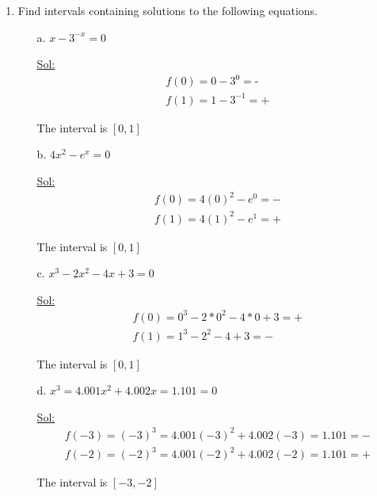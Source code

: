 \begin{enumerate}
  \item Find intervals containing solutions to the following equations.
    \begin{itemize}
      \item[a.] $x-3^{-x} = 0$

        \underline{Sol:}\\
        $$
        \begin{array}{l}
          f(0) = 0 - 3^0 = \textrm{-}\\
          f(1) = 1 - 3^{-1} = \textrm{+}
        \end{array}
        $$

        The interval is $[0, 1]$

        \bigbreak
      \item[b.] $4x^2 - e^x = 0$

        \underline{Sol:}\\
        $$
        \begin{array}{l}
          f(0) = 4(0)^2 - e^0 = -\\
          f(1) = 4(1)^2 - e^1 = +
        \end{array}
        $$

        The interval is $[0, 1]$
        \bigbreak

      \item[c.] $x^3 - 2x^2 - 4x + 3 = 0$

        \underline{Sol:}\\
        $$
        \begin{array}{l}
          f(0) = 0^3 - 2*0^2 - 4*0 + 3 = + \\
          f(1) = 1^3 - 2^2 - 4 + 3 = -
        \end{array}
        $$

        The interval is $[0, 1]$

        \bigbreak
      \item[d.] $x^3 = 4.001x^2 + 4.002x = 1.101 = 0$

        \underline{Sol:}\\

        $$
        \begin{array}{l}
          f(-3) = (-3)^3 = 4.001(-3)^2 + 4.002(-3) = 1.101 = -\\
          f(-2) = (-2)^3 = 4.001(-2)^2 + 4.002(-2) = 1.101 = +
        \end{array}
        $$

        The interval is $[-3, -2]$
        \bigbreak


\end{itemize}
\end{enumerate}
